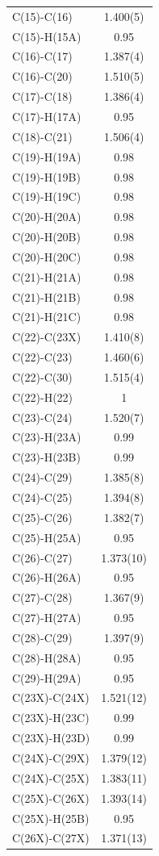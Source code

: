 \begin{center}
{\begin{supertabular}{p{1.5in}c}
C(15)-C(16) &1.400(5)\\
C(15)-H(15A) &0.95\\
C(16)-C(17) &1.387(4)\\
C(16)-C(20) &1.510(5)\\
C(17)-C(18) &1.386(4)\\
C(17)-H(17A) &0.95\\
C(18)-C(21) &1.506(4)\\
C(19)-H(19A) &0.98\\
C(19)-H(19B) &0.98\\
C(19)-H(19C) &0.98\\
C(20)-H(20A) &0.98\\
C(20)-H(20B) &0.98\\
C(20)-H(20C) &0.98\\
C(21)-H(21A) &0.98\\
C(21)-H(21B) &0.98\\
C(21)-H(21C) &0.98\\
C(22)-C(23X) &1.410(8)\\
C(22)-C(23) &1.460(6)\\
C(22)-C(30) &1.515(4)\\
C(22)-H(22) &1\\
C(23)-C(24) &1.520(7)\\
C(23)-H(23A) &0.99\\
C(23)-H(23B) &0.99\\
C(24)-C(29) &1.385(8)\\
C(24)-C(25) &1.394(8)\\
C(25)-C(26) &1.382(7)\\
C(25)-H(25A) &0.95\\
C(26)-C(27) &1.373(10)\\
C(26)-H(26A) &0.95\\
C(27)-C(28) &1.367(9)\\
C(27)-H(27A) &0.95\\
C(28)-C(29) &1.397(9)\\
C(28)-H(28A) &0.95\\
C(29)-H(29A) &0.95\\
C(23X)-C(24X) &1.521(12)\\
C(23X)-H(23C) &0.99\\
C(23X)-H(23D) &0.99\\
C(24X)-C(29X) &1.379(12)\\
C(24X)-C(25X) &1.383(11)\\
C(25X)-C(26X) &1.393(14)\\
C(25X)-H(25B) &0.95\\
C(26X)-C(27X) &1.371(13)\\

\end{supertabular}}
\end{center}
